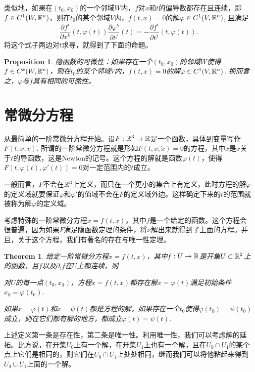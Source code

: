 \documentclass[10pt]{article}
\theoremstyle{plain}%
\newtheorem{pro}{Proposition}[section]%
\newtheorem{theo}{Theorem}[section]%
\begin{document}
类似地，如果在$(t_0,x_0)$的一个邻域$W$内，$f$对$x$和$t$的偏导数都存在且连续，即$f\in C^1(W,\mathbb{R}^n)$，则在$t_0$的某个邻域$V$内，$f(t,x)=0$的解$\varphi\in C^1(V,\mathbb{R}^n)$, 且满足
\[
	\frac{\partial f^i}{\partial x^k}(t,\varphi(t))\frac{\partial \varphi^k}{\partial t^j}(t)=-\frac{\partial f^i}{\partial t^j}(t,\varphi(t)).
\]
将这个式子两边对$t$求导，就得到了下面的命题。

\begin{pro}
	隐函数的可微性：如果存在一个$(t_0,x_0)$的邻域$W$使得$f\in C^k(W,\mathbb{R}^n)$，则在$t_0$的某个邻域$V$内，$f(t,x)=0$的解$\varphi\in C^1(V,\mathbb{R}^n)$. 换而言之，$\varphi$与$f$具有相同的可微性。
\end{pro}

\section{常微分方程}

从最简单的一阶常微分方程开始。设$F:\mathbb{R}^3\to \mathbb{R}$是一个函数，具体到变量写作$F(t,x,v)$. 所谓的一阶常微分方程就是形如$F(t,x,\dot{x})=0$的方程，其中$\dot{x}$是$x$关于$t$的导函数，这是Newton的记号。这个方程的解就是函数$\varphi(t)$，使得$F(t,\varphi(t),\varphi'(t))=0$对一定范围内的$t$成立。

一般而言，$F$不会在$\mathbb{R}^3$上定义，而只在一个更小的集合上有定义，此时方程的解$\varphi$的定义域就要保证$\varphi$和$\varphi'$的值域不会在$F$的定义域外边。这样确定下来的$t$的范围就被称为解$\varphi$的定义域。

考虑特殊的一阶常微分方程$\dot{x}=f(t,x)$，其中$f$是一个给定的函数。这个方程会很普遍，因为如果$F$满足隐函数定理的条件，将$\dot{x}$解出来就得到了上面的方程。并且，关于这个方程，我们有著名的存在与唯一性定理。

\begin{theo}
	给定一阶常微分方程$\dot{x}=f(t,x)$，其中$f:U\to \mathbb{R}$是开集$U\subset \mathbb{R}^2$上的函数，且$f$以及$\partial_t f$在$U$上都连续，则

	 对$U$的每一点$(t_0,x_0)$，方程$\dot{x}=f(t,x)$都存在解$x=\varphi(t)$满足初始条件$x_0=\varphi(t_0)$.

	 如果$x=\varphi(t)$和$x=\psi(t)$都是方程的解，如果存在一个$t_0$使得$\varphi(t_0)=\psi(t_0)$成立，则在它们都有解的地方，都成立$\varphi(t)=\psi(t)$.
\end{theo}

上述定义第一条是存在性，第二条是唯一性。利用唯一性，我们可以考虑解的延拓。比方说，在开集$U_0$上有一个解，在开集$U_1$上也有一个解，且在$U_0\cap U_1$的某个点上它们是相同的，则它们在$U_0\cap U_1$上处处相同，继而我们可以将他粘起来得到$U_0\cup U_1$上面的一个解。
\end{document}
